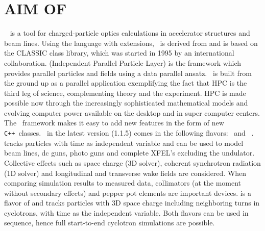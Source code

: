 \documentclass[acus]{JAC2003}
\begin{document}
\section{AIM OF \opal}
\opal\ \cite{opal} is a tool for charged-particle optics calculations in
accelerator structures and beam lines. 
Using the \mad language with extensions, \opal\ is derived from \madninep \cite{mad9} and is based 
on the
CLASSIC \cite{classic} class library,
which was started in 1995 by an international collaboration.  \ippl (Independent Parallel Particle Layer) \cite{ippl} is
the framework which provides parallel particles and fields using a data parallel ansatz. 
\opal\ is built from the ground up as a parallel application exemplifying the fact that HPC 
is the third leg of science, complementing theory and the experiment. 
HPC is made possible now through the increasingly sophisticated mathematical models and evolving computer power available on the desktop
and in super computer centers. The \opal\ framework makes 
it easy to add new features in the form of new \texttt{C++}~classes. \opal\ in the latest version (1.1.5) comes in the following flavors:
{\bf\opalcycl}\ and {\bf\opalt}\ .
\opalt  tracks particles with time as independent variable and can be used to model beam lines, dc guns, photo guns and complete XFEL's excluding the undulator. 
Collective effects such as space charge (3D solver), coherent synchrotron radiation (1D solver) and longitudinal and transverse wake fields are considered.
When comparing simulation results to measured data, collimators (at the moment without secondary effects) and pepper pot elements are important devices. 
\opalcycl is a flavor of \opalt and tracks particles with 3D space charge including neighboring turns in cyclotrons, with time as the independent variable. Both flavors can be used in sequence, hence
full start-to-end cyclotron simulations are possible.  
\end{document}
